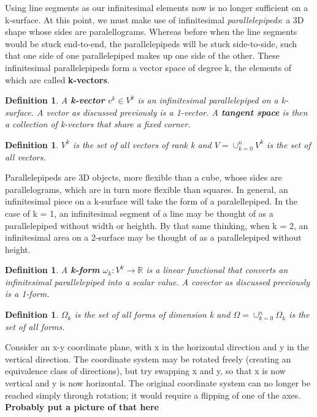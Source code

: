 \documentclass{book}
\newtheorem{defn}[equation]{Definition}
\begin{document}
Using line segments as our infinitesimal elements now is no longer sufficient on a k-surface. At this point, we must make use of infinitesimal \emph{parallelepipeds}: a 3D shape whose sides are paralellograms. Whereas before when the line segments would be stuck end-to-end, the parallelepipeds will be stuck side-to-side, such that one side of one parallelepiped makes up one side of the other. These infinitesimal parallelepipeds form a vector space of degree k, the elements of which are called \textbf{k-vectors}. 


\begin{defn}
	A \textbf{k-vector} $v^k \in V^k$ is an infinitesimal parallelepiped on a k-surface. A vector as discussed previously is a 1-vector. A \textbf{tangent space} is then a collection of k-vectors that share a fixed corner. 
\end{defn}


\begin{defn}
	$V^k$ is the set of all vectors of rank k and $V = \cup_{k=0}^n V^k$ is the set of all vectors. 
	\end{defn}

Parallelepipeds are 3D objects, more flexible than a cube, whose sides are parallelograms, which are in turn more flexible than squares. In general, an infinitesimal piece on a k-surface will take the form of a paralellepiped. In the case of k = 1, an infinitesimal segment of a line may be thought of as a parallelepiped without width or heighth. By that same thinking, when k = 2, an infinitesimal area on a 2-surface may be thought of as a parallelepiped without height. 




\begin{defn}
	A \textbf{k-form} $\omega_k : V^k \to \mathbb{R}$ is a linear functional that converts an infinitesimal parallelepiped into a scalar value. A covector as discussed previously is a 1-form. 
\end{defn}


\begin{defn}
	$\Omega_k$ is the set of all forms of dimension k and $\Omega = \cup_{k=0}^n\Omega_k$ is the set of all forms. 
\end{defn}


Consider an x-y coordinate plane, with x in the horizontal direction and y in the vertical direction. The coordinate system may be rotated freely (creating an equivalence class of directions), but try swapping x and y, so that x is now vertical and y is now horizontal. The original coordinate system can no longer be reached simply through rotation; it would require a flipping of one of the axes. 
\textbf{Probably put a picture of that here}
\end{document}
